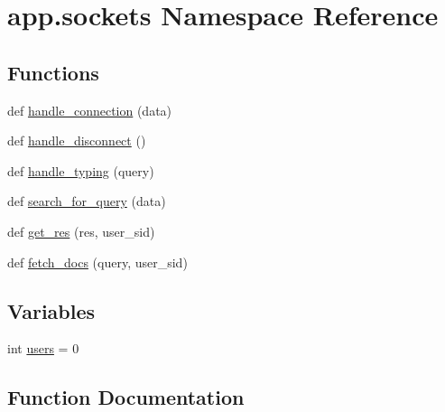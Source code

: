 \hypertarget{namespaceapp_1_1sockets}{}\section{app.\+sockets Namespace Reference}
\label{namespaceapp_1_1sockets}
\subsection*{Functions}
\begin{DoxyCompactItemize}
\item 
def \hyperlink{namespaceapp_1_1sockets_a245f18896915d69240e80005f88784d3}{handle\+\_\+connection} (data)
\item 
def \hyperlink{namespaceapp_1_1sockets_a5173060f6fc0a7732f1a6ba3cf643e87}{handle\+\_\+disconnect} ()
\item 
def \hyperlink{namespaceapp_1_1sockets_a20fdd1735ab60df72510298f457dbce8}{handle\+\_\+typing} (query)
\item 
def \hyperlink{namespaceapp_1_1sockets_adf8b1e161cef565b4c571b08e9be749a}{search\+\_\+for\+\_\+query} (data)
\item 
def \hyperlink{namespaceapp_1_1sockets_ac2893b54837e0c0eb79ba640fb4e25ab}{get\+\_\+res} (res, user\+\_\+sid)
\item 
def \hyperlink{namespaceapp_1_1sockets_a9aa9ab12de2f82eeb49b68f348284531}{fetch\+\_\+docs} (query, user\+\_\+sid)
\end{DoxyCompactItemize}
\subsection*{Variables}
\begin{DoxyCompactItemize}
\item 
int \hyperlink{namespaceapp_1_1sockets_afd959a0ffb7e2ec366c577798a5a3983}{users} = 0
\end{DoxyCompactItemize}


\subsection{Function Documentation}
